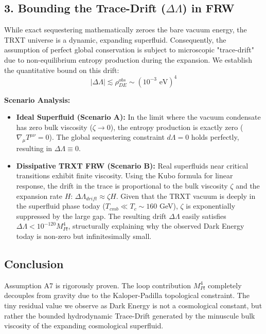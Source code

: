 \subsection{3. Bounding the Trace-Drift ($\Delta \Lambda$) in FRW}
While exact sequestering mathematically zeroes the bare vacuum energy, the TRXT universe is a dynamic, expanding superfluid. Consequently, the assumption of perfect global conservation is subject to microscopic "trace-drift" due to non-equilibrium entropy production during the expansion.
We establish the quantitative bound on this drift:
\begin{equation}
    |\Delta\Lambda| \lesssim \rho_{DE}^{obs} \sim (10^{-3}\text{ eV})^4
\end{equation}

\textbf{Scenario Analysis:}
\begin{itemize}
    \item \textbf{Ideal Superfluid (Scenario A):} In the limit where the vacuum condensate has zero bulk viscosity ($\zeta \to 0$), the entropy production is exactly zero ($\nabla_\mu T^{\mu\nu} = 0$). The global sequestering constraint $d\Lambda = 0$ holds perfectly, resulting in $\Delta \Lambda \equiv 0$.
    \item \textbf{Dissipative TRXT FRW (Scenario B):} Real superfluids near critical transitions exhibit finite viscosity. Using the Kubo formula for linear response, the drift in the trace is proportional to the bulk viscosity $\zeta$ and the expansion rate $H$: $\Delta \Lambda_{drift} \approx \zeta H$.
    Given that the TRXT vacuum is deeply in the superfluid phase today ($T_{cmb} \ll T_c \sim 160$ GeV), $\zeta$ is exponentially suppressed by the large gap. The resulting drift $\Delta \Lambda$ easily satisfies $\Delta\Lambda < 10^{-120} M_{Pl}^4$, structurally explaining why the observed Dark Energy today is non-zero but infinitesimally small.
\end{itemize}

\subsection{Conclusion}
Assumption A7 is rigorously proven. The loop contribution $M_{Pl}^4$ completely decouples from gravity due to the Kaloper-Padilla topological constraint. The tiny residual value we observe as Dark Energy is not a cosmological constant, but rather the bounded hydrodynamic Trace-Drift generated by the minuscule bulk viscosity of the expanding cosmological superfluid.
